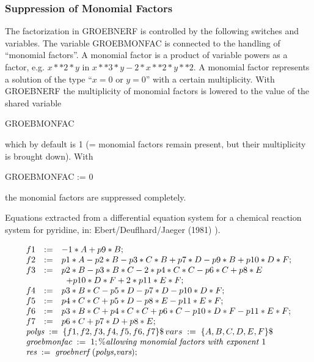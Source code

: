\subsubsection{Suppression of Monomial Factors}
The factorization in GROEBNERF is controlled by the following
switches and variables.  The variable GROEBMONFAC is connected to
the handling of ``monomial factors''.  A monomial factor is a product
of variable powers as a factor, e.g. $ x**2*y$  in  $x**3*y -
2*x**2*y**2$.  A monomial factor represents a solution of the type
``$ x = 0$  or  $y = 0$'' with a certain multiplicity.  With
GROEB\-NERF 
the multiplicity of monomial factors is lowered to the value of the
shared variable
\begin{center}
GROEBMONFAC
\end{center}
which by default is 1 (= monomial factors remain present, but their
multiplicity is brought down). With
\begin{center}
GROEBMONFAC := 0
\end{center}
the monomial factors are suppressed completely.

\example{}

Equations extracted from a differential equation system for a
chemical reaction system for pyridine, in: {\sc Ebert/Deuflhard/Jaeger}
(1981) \cite{Ebert:81}).

\[
\begin{array}{lll}
f1 & := & -1*A + p9*B; \\
f2 & := & p1*A - p2*B - p3*C*B + p7*D - p9*B + p10*D*F; \\
f3 & := & p2*B - p3*B*C - 2*p4*C*C - p6*C + p8*E \\
& &  \;\;+ p10*D*F + 2*p11*E*F;\\
f4 & := & p3*B*C - p5*D - p7*D - p10*D*F; \\
f5 & := & p4*C*C + p5*D -p8*E - p11*E*F; \\
f6 & := & p3*B*C + p4*C*C + p6*C - p10*D*F - p11*E*F; \\
f7 & := & p6*C + p7*D + p8*E; \\
\multicolumn{3}{l}{\mbox{\it polys}\; :=\;\{f1,f2,f3,f4,f5,f6,f7\} \$
 \,vars\; :
=\;
\{A,B,C,D,E,F\}\$} \\
\multicolumn{3}{l}{\mbox{\it groebmonfac}\; :=\; 1;  \%\mbox{\it
allowing monomial factors with exponent $1$}} \\
\multicolumn{3}{l}{\mbox{\it res} \;:=\; \mbox{\it  groebnerf
$($polys,vars$)$};}
\end{array}
\]

